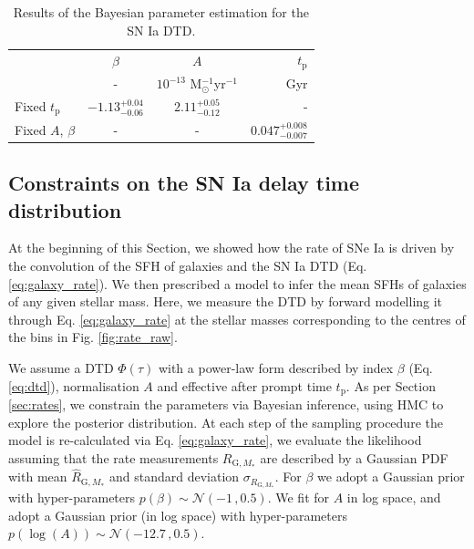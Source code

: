 \documentclass[fleqn,usenatbib]{mnras}
\begin{document}
\renewcommand{\arraystretch}{1.2}
\begin{table}
	\centering
	\caption{Results of the Bayesian parameter estimation for the SN Ia DTD.}
	\label{tab:dtd_results}
	\begin{tabular}{lccr} %
		\hline
		 &$\beta$ & $A$ & $t_{\mathrm{p}}$\\
		 &-       & $10^{-13}$ M$_{\odot}^{-1}$yr$^{-1}$ & Gyr \\
		\hline
		Fixed $t_{\mathrm{p}}$ & $-1.13^{+0.04}_{-0.06}$ &  $2.11^{+0.05}_{-0.12}$ & -\\
		Fixed $A$, $\beta$ & - & - & $0.047_{-0.007}^{+0.008}$\\
		\hline
	\end{tabular}
\end{table}

\subsection{Constraints on the SN Ia delay time distribution}
\label{subsec:results_dtd}

At the beginning of this Section, we showed how the rate of SNe Ia is driven by the convolution of the SFH of galaxies and the SN Ia DTD (Eq. \ref{eq:galaxy_rate}). We then prescribed a model to infer the mean SFHs of galaxies of any given stellar mass. Here, we measure the DTD by forward modelling it through Eq. \ref{eq:galaxy_rate} at the stellar masses corresponding to the centres of the bins in Fig. \ref{fig:rate_raw}. 

We assume a DTD $\Phi(\tau)$ with a power-law form described by index $\beta$ (Eq. \ref{eq:dtd}), normalisation $A$ and effective after prompt time $t_{\mathrm{p}}$. As per Section \ref{sec:rates}, we constrain the parameters via Bayesian inference, using HMC to explore the posterior distribution. At each step of the sampling procedure the model is re-calculated via Eq. \ref{eq:galaxy_rate}, we evaluate the likelihood assuming that the rate measurements $R_{\mathrm{G}, M_*}$ are described by a Gaussian PDF with mean $\hat R_{\mathrm{G}, M_*}$ and standard deviation $\sigma_{R_{\mathrm{G}, M_*}}$. For $\beta$ we adopt a Gaussian prior with hyper-parameters $p(\beta) \sim \mathcal{N}(-1\,,0.5)$. We fit for $A$ in log space, and adopt a Gaussian prior (in log space) with hyper-parameters $p(\log(A)) \sim \mathcal{N}(-12.7\,, 0.5)$.
\end{document}
